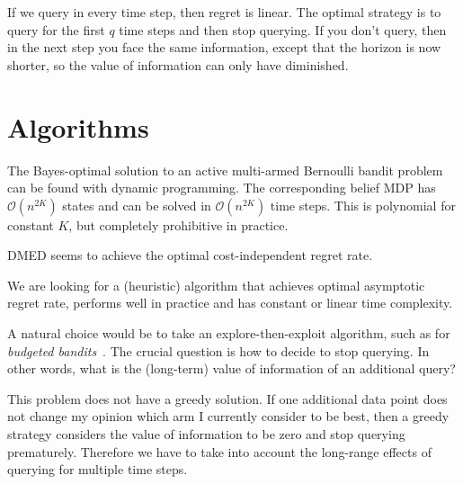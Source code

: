 \documentclass[a4paper]{article}
\begin{document}


If we query in every time step, then regret is linear.
The optimal strategy is to query for the first $q$ time steps and then stop querying.
If you don't query, then in the next step you face the same information, except that the horizon is now shorter,
so the value of information can only have diminished.



\section{Algorithms}

The Bayes-optimal solution to an active multi-armed Bernoulli bandit problem can be found with dynamic programming.
The corresponding belief MDP has $\mathcal{O}(n^{2K})$ states
and can be solved in $\mathcal{O}(n^{2K})$ time steps.
This is polynomial for constant $K$,
but completely prohibitive in practice.

DMED seems to achieve the optimal cost-independent regret rate.

We are looking for a (heuristic) algorithm that achieves optimal asymptotic regret rate, performs well in practice and has constant or linear time complexity.

A natural choice would be to take an explore-then-exploit algorithm, such as for \emph{budgeted bandits}~\citep{...}.
The crucial question is how to decide to stop querying.
In other words, what is the (long-term) value of information of an additional query?

This problem does not have a greedy solution.
If one additional data point does not change my opinion
which arm I currently consider to be best,
then a greedy strategy considers the value of information to be zero and stop querying prematurely.
Therefore we have to take into account the long-range effects of querying for multiple time steps.
\end{document}
